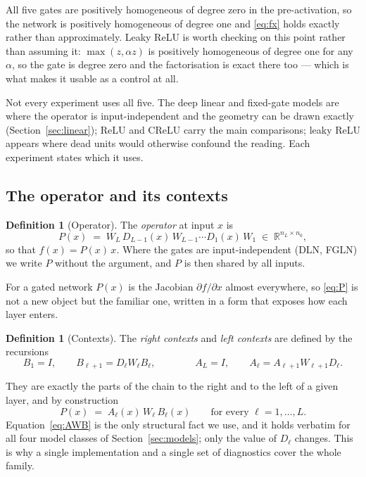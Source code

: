 \documentclass{article} %
\theoremstyle{plain}
\theoremstyle{definition}
\newtheorem{definition}[theorem]{Definition}
\theoremstyle{remark}
\begin{document}
All five gates are positively homogeneous of degree zero in the pre-activation, so the network is
positively homogeneous of degree one and \eqref{eq:fx} holds exactly rather than approximately.
Leaky ReLU is worth checking on this point rather than assuming it: $\max(z, \alpha z)$ is
positively homogeneous of degree one for any $\alpha$, so the gate is degree zero and the
factorisation is exact there too --- which is what makes it usable as a control at all.

Not every experiment uses all five. The deep linear and fixed-gate models are where the operator is
input-independent and the geometry can be drawn exactly (Section~\ref{sec:linear}); ReLU and CReLU
carry the main comparisons; leaky ReLU appears where dead units would otherwise confound the
reading. Each experiment states which it uses.

\subsection{The operator and its contexts}
\label{sec:contexts}

\begin{definition}[Operator]
The \emph{operator} at input $x$ is
\begin{equation}
  P(x) \;=\; W_L\, D_{L-1}(x)\, W_{L-1} \cdots D_1(x)\, W_1
  \;\in\; \mathbb{R}^{n_L \times n_0},
  \label{eq:P}
\end{equation}
so that $f(x) = P(x)\,x$. Where the gates are input-independent (DLN, FGLN) we write $P$ without
the argument, and $P$ is then shared by all inputs.
\end{definition}

For a gated network $P(x)$ is the Jacobian $\partial f/\partial x$ almost everywhere, so
\eqref{eq:P} is not a new object but the familiar one, written in a form that exposes how each
layer enters.

\begin{definition}[Contexts]
The \emph{right contexts} and \emph{left contexts} are defined by the recursions
\begin{equation}
  B_1 = I, \qquad B_{\ell+1} = D_\ell W_\ell B_\ell,
  \qquad\qquad
  A_L = I, \qquad A_\ell = A_{\ell+1} W_{\ell+1} D_\ell .
  \label{eq:contexts}
\end{equation}
\end{definition}

They are exactly the parts of the chain to the right and to the left of a given layer, and by
construction
\begin{equation}
  P(x) \;=\; A_\ell(x)\, W_\ell\, B_\ell(x)
  \qquad \text{for every } \ell = 1,\dots,L .
  \label{eq:AWB}
\end{equation}
Equation~\eqref{eq:AWB} is the only structural fact we use, and it holds verbatim for all four
model classes of Section~\ref{sec:models}; only the value of $D_\ell$ changes. This is why a
single implementation and a single set of diagnostics cover the whole family.
\end{document}
